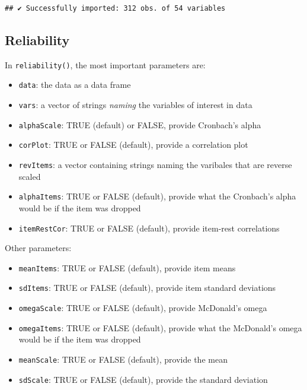 \documentclass[
]{ctexart}
\providecommand{\tightlist}{%
  \setlength{\itemsep}{0pt}\setlength{\parskip}{0pt}}
\begin{document}
\begin{verbatim}
## ✔ Successfully imported: 312 obs. of 54 variables
\end{verbatim}

\hypertarget{reliability}{%
\subsection{Reliability}\label{reliability}}

In \texttt{reliability()}, the most important parameters are:

\begin{itemize}
\tightlist
\item
  \texttt{data}: the data as a data frame
\item
  \texttt{vars}: a vector of strings \emph{naming} the variables of
  interest in data
\item
  \texttt{alphaScale}: TRUE (default) or FALSE, provide Cronbach's alpha
\item
  \texttt{corPlot}: TRUE or FALSE (default), provide a correlation plot
\item
  \texttt{revItems}: a vector containing strings naming the varibales
  that are reverse scaled
\item
  \texttt{alphaItems}: TRUE or FALSE (default), provide what the
  Cronbach's alpha would be if the item was dropped
\item
  \texttt{itemRestCor}: TRUE or FALSE (default), provide item-rest
  correlations
\end{itemize}

Other parameters:

\begin{itemize}
\tightlist
\item
  \texttt{meanItems}: TRUE or FALSE (default), provide item means
\item
  \texttt{sdItems}: TRUE or FALSE (default), provide item standard
  deviations
\item
  \texttt{omegaScale}: TRUE or FALSE (default), provide McDonald's omega
\item
  \texttt{omegaItems}: TRUE or FALSE (default), provide what the
  McDonald's omega would be if the item was dropped
\item
  \texttt{meanScale}: TRUE or FALSE (default), provide the mean
\item
  \texttt{sdScale}: TRUE or FALSE (default), provide the standard
  deviation
\end{itemize}
\end{document}
